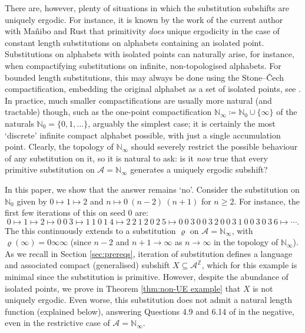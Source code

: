 \documentclass[11pt]{amsart}
\numberwithin{equation}{section}
\theoremstyle{plain}
\theoremstyle{definition}
\newcommand{\Z}{{\mathbb Z}}
\newcommand{\N}{{\mathbb N}}
\newcommand{\mc}{\mathcal}
\newcommand{\A}{\mc A}
\newcommand{\sub}{\varrho}
\begin{document}
There are, however, plenty of situations in which the substitution subshifts are uniquely ergodic. For instance, it is known by the work of the current author with Ma\~{n}ibo and Rust \cite{MRW25} that primitivity \emph{does} unique ergodicity in the case of constant length substitutions on alphabets containing an isolated point. Substitutions on alphabets with isolated points can naturally arise, for instance, when compactifying substitutions on infinite, non-topologised alphabets. For bounded length substitutions, this may always be done using the Stone--\v{C}ech compactification, embedding the original alphabet as a set of isolated points, see \cite[Section 3.2]{MRW25}. In practice, much smaller compactifications are usually more natural (and tractable) though, such as the one-point compactification \(\N_\infty \coloneqq \N_0 \cup \{\infty\}\) of the naturals \(\N_0 = \{0,1,\ldots\}\), arguably the simplest case; it is certainly the most `discrete' infinite compact alphabet possible, with just a single accumulation point. Clearly, the topology of \(\N_\infty\) should severely restrict the possible behaviour of any substitution on it, so it is natural to ask: is it \emph{now} true that every primitive substitution on \(\A = \N_\infty\) generates a uniquely ergodic subshift?

In this paper, we show that the answer remains `no'. Consider the substitution on \(\N_0\) given by \(0 \mapsto 1 \mapsto 2\) and \(n \mapsto {0 \ (n-2) \ (n+1)}\) for \(n \geq 2\). For instance, the first few iterations of this on seed \(0\) are:
\[
0 \mapsto 1 \mapsto 2 \mapsto 0 \ 0 \ 3 \mapsto 1 \ 1 \ 0 \ 1 \ 4 \mapsto 2 \ 2 \ 1 \ 2 \ 0 \ 2 \ 5 \mapsto 0 \ 0 \ 3 \ 0 \ 0 \ 3  \ 2 \ 0 \ 0 \ 3 \ 1 \ 0 \ 0 \ 3  \ 0 \ 3 \ 6 \mapsto  \cdots .
\]
The this continuously extends to a substitution \(\sub\) on \(\A = \N_\infty\), with \(\sub(\infty) = 0 \infty \infty\) (since \(n-2\) and \(n+1 \to \infty\) as \(n \to \infty\) in the topology of \(\N_\infty\)). As we recall in Section \ref{sec:prereqs}, iteration of substitution defines a language and associated compact (generalised) subshift \(X \subseteq \A^\Z\), which for this example is minimal since the substitution is primitive. However, despite the abundance of isolated points, we prove in Theorem \ref{thm:non-UE example} that \(X\) is not uniquely ergodic. Even worse, this substitution does not admit a natural length function (explained below), answering Questions 4.9 and 6.14 of \cite{MRW25} in the negative, even in the restrictive case of \(\A = \N_\infty\).
\end{document}

